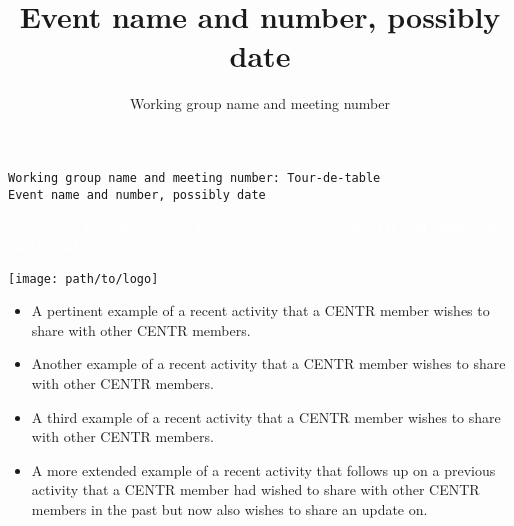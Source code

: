 \documentclass[handout]{beamer}
\title{Event name and number, possibly date}
\author{Working group name and meeting number}
\begin{document}
{
  \begin{frame}[plain]

\vspace{135pt}
    
    \begin{titleBox}
      \texttt{Working group name and meeting number: Tour-de-table
        \\
      {\small Event name and number, possibly date}}
    \end{titleBox}

\vspace{20pt}
    
        \begin{subtitleBox}
          \textcolor{white}{{\tiny Chairs: The first chair (orga), The second chair (orga) \hspace{20pt} CENTR staff (\texttt{email to centr staff})}}
\end{subtitleBox}
  \end{frame}
}

\begin{frame}{\texttt{[image: path/to/logo]}}

\begin{itemize}
\item {\small A pertinent example of a recent activity that a CENTR member wishes to share with other CENTR members.}
\item {\small Another example of a recent activity that a CENTR member wishes to share with other CENTR members.}
\item {\small A third example of a recent activity that a CENTR member wishes to share with other CENTR members.}
\item {\small A more extended example of a recent activity that follows up on a previous activity that a CENTR member had wished to share with other CENTR members in the past but now also wishes to share an update on.}
\end{itemize}


\end{frame}
\end{document}
